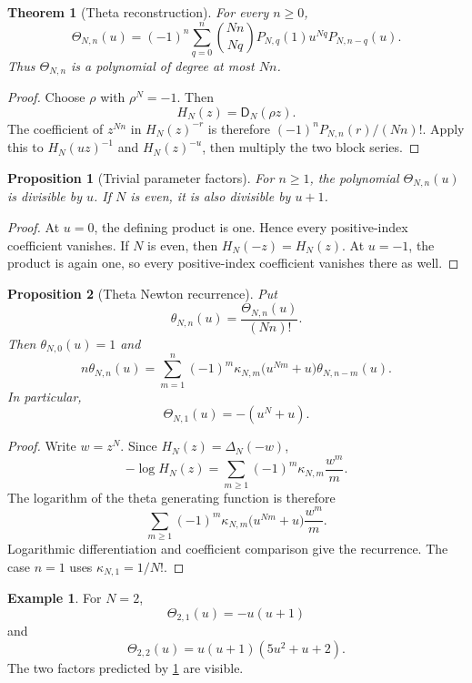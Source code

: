 \documentclass[11pt]{article}
\newtheorem{theorem}{Theorem}[section]
\newtheorem{proposition}[proposition]{Proposition}
\theoremstyle{definition}
\newtheorem{example}[example]{Example}
\theoremstyle{remark}
\newcommand{\Dfun}{\mathsf D}
\newcommand{\Thetafun}{\mathsf\Theta}
\begin{document}
\begin{theorem}[Theta reconstruction]\label{thm:theta_reconstruction}
For every $n\geq0$,
\[
\Thetafun_{N,n}(u)
=
(-1)^n
\sum_{q=0}^{n}
\binom{Nn}{Nq}
P_{N,q}(1)u^{Nq}P_{N,n-q}(u).
\]
Thus $\Thetafun_{N,n}$ is a polynomial of degree at most $Nn$.
\end{theorem}

\begin{proof}
Choose $\rho$ with $\rho^N=-1$.  Then
\[
H_N(z)=\Dfun_N(\rho z).
\]
The coefficient of $z^{Nn}$ in $H_N(z)^{-r}$ is therefore $(-1)^nP_{N,n}(r)/(Nn)!$.  Apply this to $H_N(uz)^{-1}$ and $H_N(z)^{-u}$, then multiply the two block series.
\end{proof}

\begin{proposition}[Trivial parameter factors]\label{prop:theta_factors}
For $n\geq1$, the polynomial $\Thetafun_{N,n}(u)$ is divisible by $u$.  If $N$ is even, it is also divisible by $u+1$.
\end{proposition}

\begin{proof}
At $u=0$, the defining product is one.  Hence every positive-index coefficient vanishes.  If $N$ is even, then $H_N(-z)=H_N(z)$.  At $u=-1$, the product is again one, so every positive-index coefficient vanishes there as well.
\end{proof}


\begin{proposition}[Theta Newton recurrence]\label{prop:theta_newton_recurrence}
Put
\[
\theta_{N,n}(u)=\frac{\Thetafun_{N,n}(u)}{(Nn)!}.
\]
Then $\theta_{N,0}(u)=1$ and
\[
n\theta_{N,n}(u)
=
\sum_{m=1}^{n}
(-1)^m\kappa_{N,m}
\bigl(u^{Nm}+u\bigr)
\theta_{N,n-m}(u).
\]
In particular,
\[
\Thetafun_{N,1}(u)=-(u^N+u).
\]
\end{proposition}

\begin{proof}
Write $w=z^N$.  Since $H_N(z)=\Delta_N(-w)$,
\[
-\log H_N(z)
=
\sum_{m\geq1}(-1)^m\kappa_{N,m}\frac{w^m}{m}.
\]
The logarithm of the theta generating function is therefore
\[
\sum_{m\geq1}
(-1)^m\kappa_{N,m}
\bigl(u^{Nm}+u\bigr)
\frac{w^m}{m}.
\]
Logarithmic differentiation and coefficient comparison give the recurrence.  The case $n=1$ uses $\kappa_{N,1}=1/N!$.
\end{proof}

\begin{example}\label{ex:theta_even}
For $N=2$,
\[
\Thetafun_{2,1}(u)=-u(u+1)
\]
and
\[
\Thetafun_{2,2}(u)
=
u(u+1)(5u^2+u+2).
\]
The two factors predicted by \cref{prop:theta_factors} are visible.
\end{example}
\end{document}
